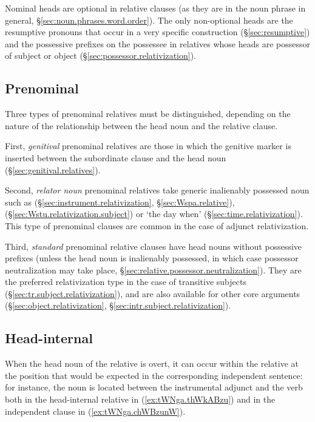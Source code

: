Nominal heads are optional in relative clauses (as they are in the noun phrase in general, §\ref{sec:noun.phrases.word.order}). The only non-optional heads are the resumptive pronouns that occur in a very specific construction (§\ref{sec:resumptive}) and the possessive prefixes on the possessee in relatives whose heads are possessor of subject or object (§\ref{sec:possessor.relativization}).

\subsection{Prenominal} \label{sec:prenominal.relative}
Three types of prenominal relatives must be distinguished, depending on the nature of the relationship between the head noun and the relative clause.

First, \textit{genitival} prenominal relatives are those in which the genitive marker  is inserted between the subordinate clause and the head noun (§\ref{sec:genitival.relatives}). 
 
Second, \textit{relator noun} prenominal relatives take generic inalienably possessed noun such as  (§\ref{sec:instrument.relativization}, §\ref{sec:Wspa.relative}),  (§\ref{sec:Wstu.relativization.subject}) or  `the day when' (§\ref{sec:time.relativization}). This type of prenominal clauses are common in the case of adjunct relativization. 

Third, \textit{standard} prenominal relative clauses have head nouns without possessive prefixes (unless the head noun is inalienably possessed, in which case possessor neutralization may take place, §\ref{sec:relative.possessor.neutralization}). They are the preferred relativization type in the case of transitive subjects (§\ref{sec:tr.subject.relativization}), and are also available for other core arguments (§\ref{sec:object.relativization}, §\ref{sec:intr.subject.relativization}).

\subsection{Head-internal} \label{sec:head-internal.relative}  
When the head noun of the relative is overt, it can occur within the relative at the position that would be expected in the corresponding independent sentence: for instance, the noun  is located between the instrumental adjunct and the verb both in the head-internal relative in (\ref{ex:tWNga.thWkABzu}) and in the independent clause in (\ref{ex:tWNga.chWBzunW}).


